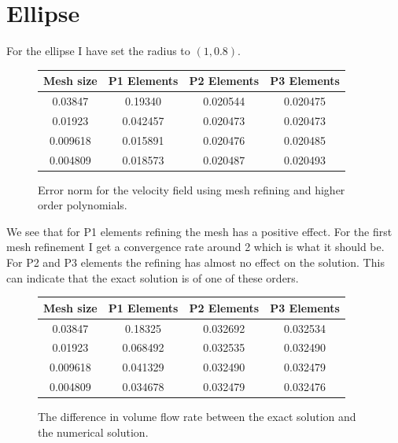 \documentclass[11pt]{report}
\begin{document}
\section*{Ellipse}

For the ellipse I have set the radius to $(1, 0.8)$.
\begin{figure}[htb]
\begin{center}
\begin{tabular}{|c|c|c|c|}
\hline
Mesh size & P1 Elements & P2 Elements & P3 Elements \\ \hline
0.03847 & 0.19340  & 0.020544 & 0.020475         \\ \hline
0.01923 & 0.042457 & 0.020473 & 0.020473           \\ \hline
0.009618 & 0.015891 & 0.020476 & 0.020485           \\ \hline
0.004809 & 0.018573 & 0.020487 & 0.020493           \\ \hline
\end{tabular}
\end {center}
\caption{Error norm for the velocity field using mesh refining and higher order polynomials.}
\end{figure}

We see that for P1 elements refining the mesh has a positive effect. For the first mesh refinement I get a convergence rate around 2 which is what it should be. For P2 and P3 elements the refining has almost no effect on the solution. This can indicate that the exact solution is of one of these orders. 

\begin{figure}[htb]
\begin{center}
\begin{tabular}{|c|c|c|c|}
\hline
Mesh size & P1 Elements & P2 Elements & P3 Elements \\ \hline
0.03847 & 0.18325  & 0.032692 & 0.032534         \\ \hline
0.01923 & 0.068492 & 0.032535 & 0.032490           \\ \hline
0.009618 & 0.041329 & 0.032490 & 0.032479           \\ \hline
0.004809 & 0.034678 & 0.032479 & 0.032476           \\ \hline
\end{tabular}
\end {center}
\caption{The difference in volume flow rate between the exact solution and the numerical solution.}
\end{figure}
\end{document}
